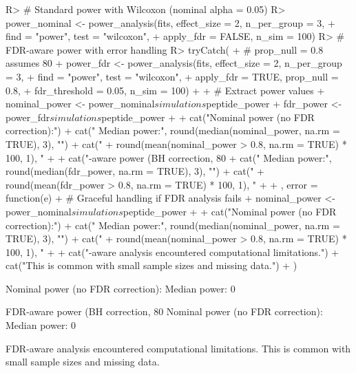 \documentclass[article]{jss}
\begin{document}
\begin{Schunk}
\begin{Sinput}
R> # Standard power with Wilcoxon (nominal alpha = 0.05)
R> power_nominal <- power_analysis(fits, effect_size = 2, n_per_group = 3,
+                                 find = "power", test = "wilcoxon",
+                                 apply_fdr = FALSE, n_sim = 100)
R> # FDR-aware power with error handling
R> tryCatch({
+    # prop_null = 0.8 assumes 80%
+    power_fdr <- power_analysis(fits, effect_size = 2, n_per_group = 3,
+                               find = "power", test = "wilcoxon",
+                               apply_fdr = TRUE, prop_null = 0.8,
+                               fdr_threshold = 0.05, n_sim = 100)
+  
+    # Extract power values
+    nominal_power <- power_nominal$simulations$peptide_power
+    fdr_power <- power_fdr$simulations$peptide_power
+  
+    cat("Nominal power (no FDR correction):\n")
+    cat("  Median power:", round(median(nominal_power, na.rm = TRUE), 3), "\n")
+    cat("  %
+        round(mean(nominal_power > 0.8, na.rm = TRUE) * 100, 1), "%
+  
+    cat("\nFDR-aware power (BH correction, 80%
+    cat("  Median power:", round(median(fdr_power, na.rm = TRUE), 3), "\n")
+    cat("  %
+        round(mean(fdr_power > 0.8, na.rm = TRUE) * 100, 1), "%
+  
+  }, error = function(e) {
+    # Graceful handling if FDR analysis fails
+    nominal_power <- power_nominal$simulations$peptide_power
+  
+    cat("Nominal power (no FDR correction):\n")
+    cat("  Median power:", round(median(nominal_power, na.rm = TRUE), 3), "\n")
+    cat("  %
+        round(mean(nominal_power > 0.8, na.rm = TRUE) * 100, 1), "%
+  
+    cat("\nFDR-aware analysis encountered computational limitations.\n")
+    cat("This is common with small sample sizes and missing data.\n")
+  })
\end{Sinput}
\begin{Soutput}
Nominal power (no FDR correction):
  Median power: 0 

FDR-aware power (BH correction, 80%
Nominal power (no FDR correction):
  Median power: 0 

FDR-aware analysis encountered computational limitations.
This is common with small sample sizes and missing data.
\end{Soutput}
\end{Schunk}
\end{document}
